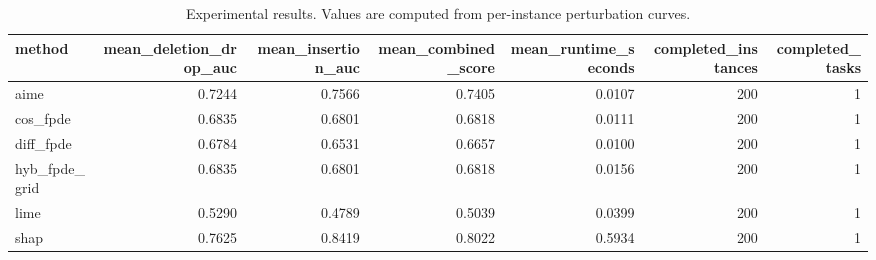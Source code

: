 \begin{table}[t]
\caption{Experimental results. Values are computed from per-instance perturbation curves.}
\label{tab:main_results_computed}
\centering
\begin{tabular}{lrrrrrr}
\toprule
method & mean\_deletion\_drop\_auc & mean\_insertion\_auc & mean\_combined\_score & mean\_runtime\_seconds & completed\_instances & completed\_tasks \\
\midrule
aime & 0.7244 & 0.7566 & 0.7405 & 0.0107 & 200 & 1 \\
cos\_fpde & 0.6835 & 0.6801 & 0.6818 & 0.0111 & 200 & 1 \\
diff\_fpde & 0.6784 & 0.6531 & 0.6657 & 0.0100 & 200 & 1 \\
hyb\_fpde\_grid & 0.6835 & 0.6801 & 0.6818 & 0.0156 & 200 & 1 \\
lime & 0.5290 & 0.4789 & 0.5039 & 0.0399 & 200 & 1 \\
shap & 0.7625 & 0.8419 & 0.8022 & 0.5934 & 200 & 1 \\
\bottomrule
\end{tabular}

\end{table}
